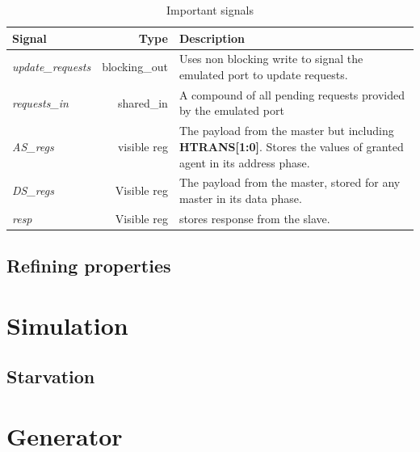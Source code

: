 \begin{table}[hbt] 
  \begin{tabular}{|p{3cm}|r|p{7cm}|} 
 \label{tab:impsig}
  \hline
  \textbf{Signal} & \textbf{Type} & \textbf{Description} \\
    \hline
  \textit{update\_requests} & blocking\_out & Uses non blocking write to signal the emulated port to update requests. \\
    \hline
  \textit{requests\_in} & shared\_in & A compound of all pending requests provided by the emulated port \\
    \hline
  \textit{AS\_regs} & visible reg & The payload from the master but including \textbf{HTRANS[1:0]}. Stores the values of granted agent in its address phase. \\
    \hline  
\textit{DS\_regs} & Visible reg & The payload from the master, stored for any master in its data phase.  \\
    \hline
\textit{resp} & Visible reg & stores response from the slave. \\
    \hline
  \end{tabular}
\caption{Important signals}
\end{table}
  

\subsection{Refining properties}
\label{sub:refine}



\section{Simulation}
\label{sec:sim}

\subsection{Starvation}

\section{Generator}
\label{sec:generator}
